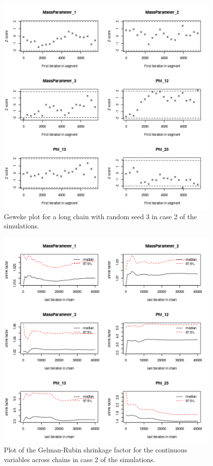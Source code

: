 \documentclass[12pt]{article} %
\begin{document}
	\begin{figure}[!htb]
			\centering
			\includegraphics[scale=0.65]{Images/Gen_data/Case_2/Geweke_plot_3.png}
			\caption{Geweke plot for a long chain with random seed 3 in case 2 of the simulations.}
			\label{fig:gen_data_case_2_geweke_plot_3}
		\end{figure}
		
	\newpage
	
	\begin{figure}[!htb]
			\centering
			\includegraphics[scale=0.65]{Images/Gen_data/Case_2/Gelman_plot.png}
			\caption{Plot of the  Gelman-Rubin shrinkage factor for the continuous variables across chains in case 2 of the simulations.}
			\label{fig:gen_data_case_2_gelman_plot}
		\end{figure}
	
\end{document}
